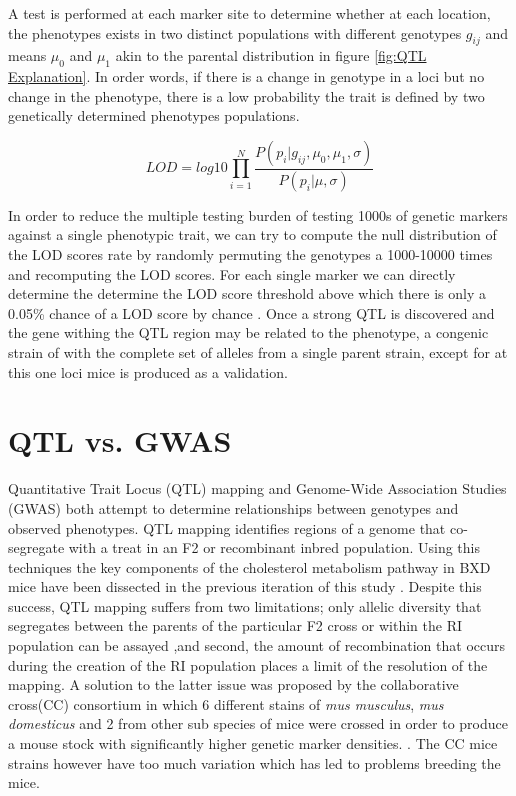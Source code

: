 \documentclass[a4paper]{book}
\begin{document}
	A test is performed at each marker site to determine whether at each location, the phenotypes exists in two distinct populations with different genotypes $g_{ij}$ and means $\mu_0$ and $\mu_1$ akin to the parental distribution in figure \ref{fig:QTL Explanation}. In order words, if there is a change in genotype in a loci but no change in the phenotype, there is a low probability the trait is defined by two genetically determined phenotypes populations\citep{Broman2009AR/qtl}.
	
	$$LOD = log10\prod_{i=1}^{N}\dfrac{P(p_i| g_{ij},\mu_0,\mu_1,\sigma )}{P(p_i|\mu,\sigma) } $$
	
	In order to reduce the multiple testing burden of testing 1000s of genetic markers against a single phenotypic trait, we can try to compute the null distribution of the LOD scores rate by randomly permuting the genotypes a 1000-10000 times and recomputing the LOD scores. For each single marker we can directly determine the determine the LOD score threshold above which there is only a 0.05\% chance of a LOD score by chance  \citep{Broman2009AR/qtl}. Once a strong QTL is discovered and the gene withing the QTL region may be related to the phenotype, a congenic strain of with the complete set of alleles from a single parent strain, except for at this one loci mice is produced as a validation. 
	
	\section{QTL vs. GWAS}
	
	Quantitative Trait Locus (QTL) mapping and Genome-Wide Association Studies (GWAS) both attempt to determine relationships between genotypes and observed phenotypes. QTL mapping identifies regions of a genome that co-segregate with a treat in an F2 or recombinant inbred population. Using this techniques the key components of the cholesterol metabolism pathway in BXD mice have been dissected in the previous iteration of this study \citep{Williams2016SystemsFunction}. Despite this success, QTL mapping suffers from two limitations; only allelic diversity that segregates between the parents of the particular F2 cross or within the RI population can be assayed ,and second, the amount of recombination that occurs during the creation of the RI population places a limit of the resolution of the mapping\citep{Williams2017ResourcesGenetics}. A solution to the latter issue was proposed by the collaborative cross(CC) consortium in which 6 different stains of \textit{mus musculus}, \textit{mus domesticus} and 2 from other sub species of mice were crossed in order to produce a mouse stock with significantly higher genetic marker densities. \citep{CollaborativeCrossConsortium2012ThePopulation.}. The CC mice strains however have too much variation which has led to problems breeding the mice.
	
\end{document}
